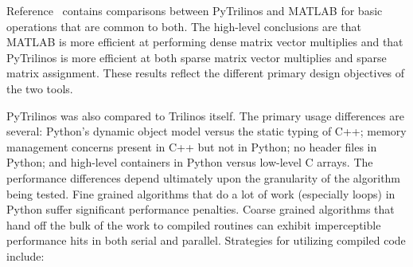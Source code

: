 \documentclass[11pt]{article}
\begin{document}
Reference~\cite{PyTrilinos} contains comparisons between PyTrilinos and MATLAB for basic operations that are common to both.  The high-level conclusions are that MATLAB is more efficient at performing dense matrix vector multiplies and that PyTrilinos is more efficient at both sparse matrix vector multiplies and sparse matrix assignment.  These results reflect the different primary design objectives of the two tools.

PyTrilinos was also compared to Trilinos itself.  The primary usage differences are several: Python's dynamic object model versus the static typing of C++; memory management concerns present in C++ but not in Python; no header files in Python; and high-level containers in Python versus low-level C arrays.  The performance differences depend ultimately upon the granularity of the algorithm being tested.  Fine grained algorithms that do a lot of work (especially loops) in Python suffer significant performance penalties.  Coarse grained algorithms that hand off the bulk of the work to compiled routines can exhibit imperceptible performance hits in both serial and parallel.  Strategies for utilizing compiled code include:
\end{document}

